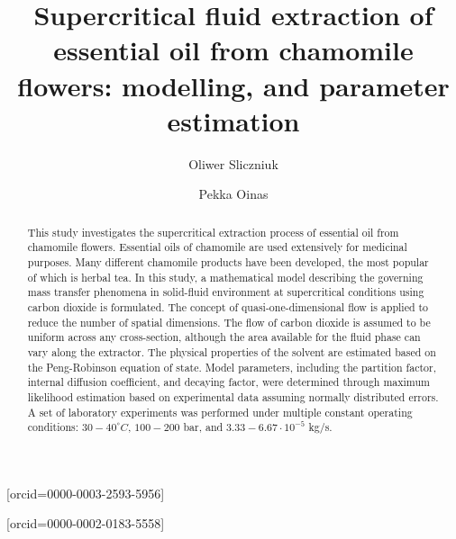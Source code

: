 \documentclass[a4paper,fleqn]{cas-dc}
\begin{document}
 

\title[mode=title]{Supercritical fluid extraction of essential oil from chamomile flowers: modelling, and parameter estimation}                      


\author[1]{Oliwer Sliczniuk}[orcid=0000-0003-2593-5956]
\cormark[1]

\author[1]{Pekka Oinas}[orcid=0000-0002-0183-5558]

\address[1]{Aalto University, School of Chemical Engineering, Espoo, 02150, Finland}


\begin{abstract}
This study investigates the supercritical extraction process of essential oil from chamomile flowers. Essential oils of chamomile are used extensively for medicinal purposes. Many different chamomile products have been developed, the most popular of which is herbal tea. In this study, a mathematical model describing the governing mass transfer phenomena in solid-fluid environment at supercritical conditions using carbon dioxide is formulated. The concept of quasi-one-dimensional flow is applied to reduce the number of spatial dimensions. The flow of carbon dioxide is assumed to be uniform across any cross-section, although the area available for the fluid phase can vary along the extractor. The physical properties of the solvent are estimated based on the Peng-Robinson equation of state. Model parameters, including the partition factor, internal diffusion coefficient, and decaying factor, were determined through maximum likelihood estimation based on experimental data assuming normally distributed errors. A set of laboratory experiments was performed under multiple constant operating conditions: $30 - 40^\circ C$, $100 - 200$ bar, and $3.33-6.67 \cdot 10^{-5}$ kg/s.


\end{abstract}
\end{document}
